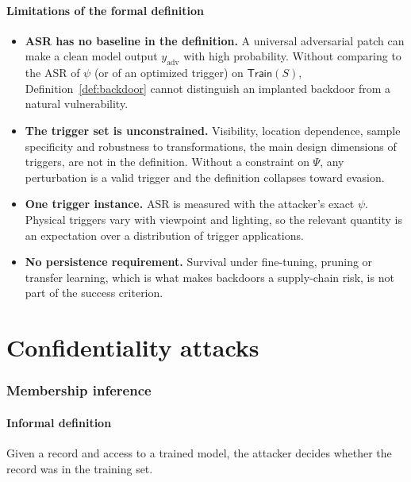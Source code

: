 \documentclass[10pt,a4paper]{extarticle}
\theoremstyle{definition}
\newcommand{\Train}{\mathsf{Train}}
\begin{document}
\subsection{Limitations of the formal definition}

\begin{itemize}[leftmargin=1.5em]
  \item \textbf{ASR has no baseline in the definition.} A universal adversarial patch can make a clean model output $y_{\text{adv}}$ with high probability. Without comparing to the ASR of $\psi$ (or of an optimized trigger) on $\Train(S)$, Definition~\ref{def:backdoor} cannot distinguish an implanted backdoor from a natural vulnerability.
  \item \textbf{The trigger set is unconstrained.} Visibility, location dependence, sample specificity and robustness to transformations, the main design dimensions of triggers, are not in the definition. Without a constraint on $\Psi$, any perturbation is a valid trigger and the definition collapses toward evasion.
  \item \textbf{One trigger instance.} ASR is measured with the attacker's exact $\psi$. Physical triggers vary with viewpoint and lighting, so the relevant quantity is an expectation over a distribution of trigger applications.
  \item \textbf{No persistence requirement.} Survival under fine-tuning, pruning or transfer learning, which is what makes backdoors a supply-chain risk, is not part of the success criterion.
\end{itemize}

\part{Confidentiality attacks}

\section{Membership inference}\label{sec:mia}

\subsection{Informal definition}

Given a record and access to a trained model, the attacker decides whether the record was in the training set.
\end{document}
